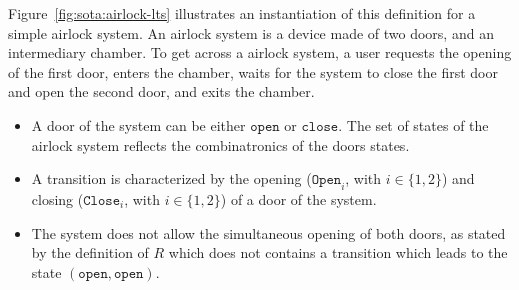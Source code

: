 \begin{example}
  Figure~\ref{fig:sota:airlock-lts} illustrates an instantiation of this
  definition for a simple airlock system.
  An airlock system is a device made of two doors, and an intermediary chamber.
  To get across a airlock system, a user requests the opening of the first door,
  enters the chamber, waits for the system to close the first door and open the
  second door, and exits the chamber.

  \begin{itemize}
  \item A door of the system can be either \( \mathtt{open} \) or
    \( \mathtt{close} \).
    The set of states of the airlock system reflects the combinatronics of the
    doors states.
  \item A transition is characterized by the opening (\( \mathtt{Open}_i\), with
    \( i \in \{1, 2\} \)) and closing (\( \mathtt{Close}_i \), with
    \( i \in \{1, 2\} \)) of a door of the system.
  \item The system does not allow the simultaneous opening of both doors, as
    stated by the definition of \( R \) which does not contains a transition
    which leads to the state \( (\mathtt{open}, \mathtt{open}) \).
  \end{itemize}
\end{example}

